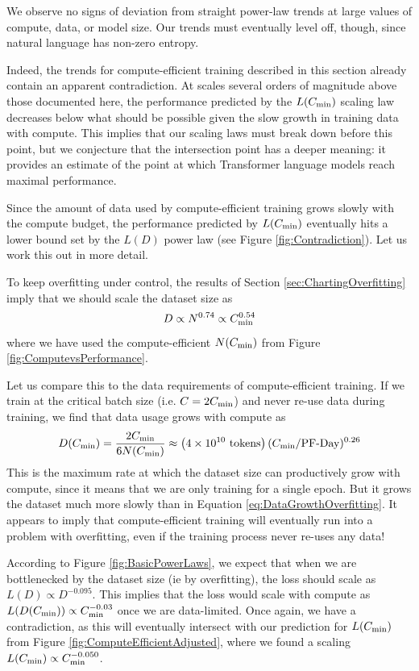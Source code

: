 \documentclass[english]{article}
\newcommand{\be}{\begin{equation}}
\newcommand{\ee}{\end{equation}}
\begin{document}
We observe no signs of deviation from straight power-law trends at large values of compute, data, or model size. Our trends must eventually level off, though, since natural language has non-zero entropy. 

Indeed, the trends for compute-efficient training described in this section already contain an apparent contradiction. At scales several orders of magnitude above those documented here, the performance predicted by the $L(C_{\rm min})$ scaling law decreases below what should be possible given the slow growth in training data with compute.  This implies that our scaling laws must break down before this point, but we conjecture that the intersection point has a deeper meaning: it provides an estimate of the point at which Transformer language models reach maximal performance.

Since the amount of data used by compute-efficient training grows  slowly with the compute budget, the performance predicted by $L(C_{\rm min})$ eventually hits a lower bound set by the $L(D)$ power law (see Figure \ref{fig:Contradiction}).  Let us work this out in more detail.

To keep overfitting under control, the results of Section \ref{sec:ChartingOverfitting} imply that we should scale the dataset size as
\be
\label{eq:DataGrowthOverfitting}
D \propto N^{0.74} \propto C_{\rm min}^{0.54}
\ee
where we have used the compute-efficient $N(C_{\rm min})$ from Figure \ref{fig:ComputevsPerformance}.

Let us compare this to the data requirements of compute-efficient training.  If we train at the critical batch size (i.e. $C=2C_{\rm min}$) and never re-use data during training, we find that data usage grows with compute as
\be
D (C_{\rm min}) = \frac{2C_{\rm min}}{6 N(C_{\rm min})} \approx \left( 4 \times 10^{10}  \ {\rm tokens} \right) (C_{\rm min} / \mathrm{PF}{\text -}\mathrm{Day}  )^{0.26} 
\ee
This is the maximum rate at which the dataset size can productively grow with compute, since it means that we are only training for a single epoch.  But it grows the dataset much more slowly than in Equation \eqref{eq:DataGrowthOverfitting}.  It appears to imply that compute-efficient training will eventually run into a problem with overfitting, even if the training process never re-uses any data!


 
According to Figure \ref{fig:BasicPowerLaws}, we expect that when we are bottlenecked by the dataset size (ie by overfitting), the loss should scale as $L(D) \propto D^{-0.095}$.  This implies that the loss would scale with compute as $L(D(C_{\rm min})) \propto C_{\rm min}^{-0.03}$ once we are data-limited.  Once again, we have a contradiction, as this will eventually intersect with our prediction for $L(C_{\rm min})$ from Figure \ref{fig:ComputeEfficientAdjusted}, where we found a scaling $L(C_{\rm min}) \propto C_{\rm min}^{-0.050}$.  
\end{document}
